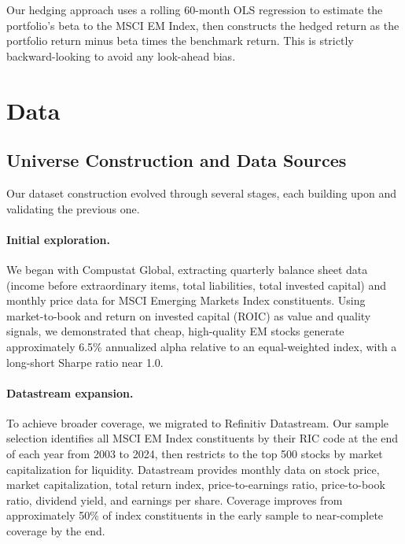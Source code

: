 \documentclass[12pt,a4paper]{article}
\begin{document}
Our hedging approach uses a rolling 60-month OLS regression to estimate the portfolio's beta to the MSCI EM Index, then constructs the hedged return as the portfolio return minus beta times the benchmark return. This is strictly backward-looking to avoid any look-ahead bias.


\section{Data}
\label{sec:data}

\subsection{Universe Construction and Data Sources}

Our dataset construction evolved through several stages, each building upon and validating the previous one.

\paragraph{Initial exploration.} We began with Compustat Global, extracting quarterly balance sheet data (income before extraordinary items, total liabilities, total invested capital) and monthly price data for MSCI Emerging Markets Index constituents. Using market-to-book and return on invested capital (ROIC) as value and quality signals, we demonstrated that cheap, high-quality EM stocks generate approximately 6.5\% annualized alpha relative to an equal-weighted index, with a long-short Sharpe ratio near 1.0.

\paragraph{Datastream expansion.} To achieve broader coverage, we migrated to Refinitiv Datastream. Our sample selection identifies all MSCI EM Index constituents by their RIC code at the end of each year from 2003 to 2024, then restricts to the top 500 stocks by market capitalization for liquidity. Datastream provides monthly data on stock price, market capitalization, total return index, price-to-earnings ratio, price-to-book ratio, dividend yield, and earnings per share. Coverage improves from approximately 50\% of index constituents in the early sample to near-complete coverage by the end.
\end{document}
